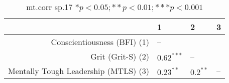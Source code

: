 \begin{table}[ht]
\centering
\begin{tabular}{rlll}
  \hline
 & 1 & 2 & 3 \\ 
  \hline
Conscientiousness (BFI) (1) & -- &  &  \\ 
  Grit (Grit-S) (2) & $0.62^{***}$ & -- &  \\ 
  Mentally Tough Leadership (MTLS) (3) & $0.23^{**}$ & $0.2^{**}$ & -- \\ 
   \hline
\end{tabular}
\caption{mt.corr sp.17 $* p < 0.05; ** p < 0.01; *** p < 0.001$} 
\label{freq_corr.mt.corr.sp.17}
\end{table}
